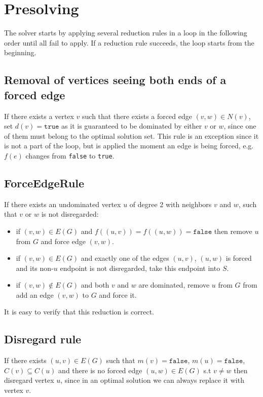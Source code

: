 \documentclass[a4paper,UKenglish,cleveref, autoref, thm-restate]{lipics-v2021}
\begin{document}
\section{Presolving}
The solver starts by applying several reduction rules in a loop in the following order until all fail to apply. If a reduction rule succeeds, the loop starts from the beginning.
\subsection{Removal of vertices seeing both ends of a forced edge}
If there exists a vertex $v$ such that there exists a forced edge $(v, w) \in N(v)$, set $d(v) = \texttt{true}$ as it is guaranteed to be dominated by either $v$ or $w$, since one of them must belong to the optimal solution set.
This rule is an exception since it is not a part of the loop, but is applied the moment an edge is being forced, e.g. $f(e)$ changes from \texttt{false} to \texttt{true}.

\subsection{ForceEdgeRule}
If there exists an undominated vertex $u$ of degree 2 with neighbors $v$ and $w$, such that $v$ or $w$ is not disregarded:
\begin{itemize}
    \item if $(v, w) \in E(G)$ and $f((u, v)) = f((u, w)) = \texttt{false}$ then remove $u$ from $G$ and force edge $(v, w)$.
    \item if $(v, w) \in E(G)$ and exactly one of the edges $(u, v)$, $(u, w)$ is forced and its non-$u$ endpoint is not disregarded, take this endpoint into $S$.
    \item if $(v, w) \notin E(G)$ and both $v$ and $w$ are dominated, remove $u$ from $G$ from add an edge $(v, w)$ to $G$ and force it.
\end{itemize}

It is easy to verify that this reduction is correct.

\subsection{Disregard rule}
If there exists $(u, v) \in E(G)$ such that $m(v) = \texttt{false}$, $m(u) = \texttt{false}$, $C(v) \subseteq C(u)$ and there is no forced edge $(u, w) \in E(G)$ s.t $v \neq w$
then disregard vertex $u$, since in an optimal solution we can always replace it with vertex $v$.
\end{document}
